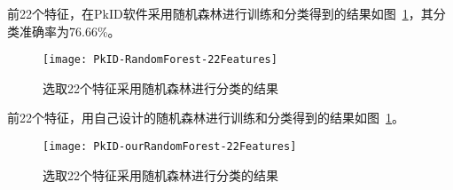 前22个特征，在PkID软件采用随机森林进行训练和分类得到的结果如图~\ref{fig:PkID-RandomForest-22Features}，其分类准确率为76.66\%。

\begin{figure}[!ht]
\centering
\texttt{[image: PkID-RandomForest-22Features]}
\caption{选取22个特征采用随机森林进行分类的结果}
\label{fig:PkID-RandomForest-22Features}
\end{figure}

前22个特征，用自己设计的随机森林进行训练和分类得到的结果如图~\ref{fig:PkID-RandomForest-22Features}。

\begin{figure}[!ht]
\centering
\texttt{[image: PkID-ourRandomForest-22Features]}
\caption{选取22个特征采用随机森林进行分类的结果}
\label{fig:PkID-ourRandomForest-22Features}
\end{figure}







